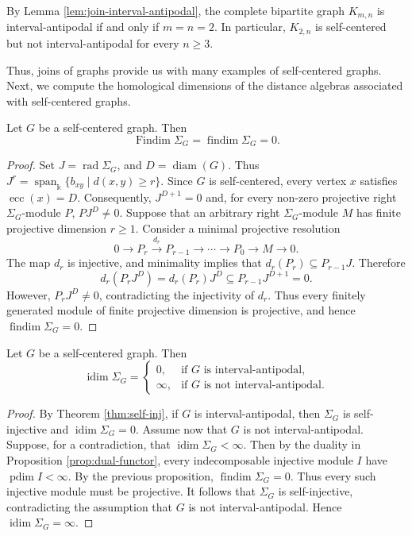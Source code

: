 \documentclass[a4paper,leqno]{amsart}
\begin{document}
\begin{eg}\label{eg:self-centered-revisited}
By Lemma \ref{lem:join-interval-antipodal}, the complete bipartite graph $K_{m,n}$ is interval-antipodal if and only if $m=n=2$. In particular, $K_{2,n}$ is self-centered but not interval-antipodal for every $n\geq3$.
\end{eg}

Thus, joins of graphs provide us with many examples of self-centered graphs. Next, we compute the homological dimensions of the distance algebras associated with self-centered graphs.

\begin{prop}
Let $G$ be a self-centered graph. Then
\[
\operatorname{Findim} \Sigma_G=\operatorname{findim} \Sigma_G=0.
\]
\end{prop}

\begin{proof}
Set $J=\operatorname{rad}\Sigma_G$, and $D=\operatorname{diam}(G)$.
Thus $J^r=\operatorname{span}_{\Bbbk}\{b_{xy}\mid d(x,y)\ge r\}$. Since $G$ is self-centered, every vertex $x$ satisfies $\operatorname{ecc}(x)=D$. Consequently, $J^{D+1}=0$ and, for every non-zero projective right $\Sigma_G$-module $P$, $PJ^D\neq 0$. Suppose that an arbitrary right $\Sigma_G$-module $M$ has finite projective dimension $r\geq 1$. Consider a minimal projective resolution
\[
0\longrightarrow P_r
 \xrightarrow{d_r}P_{r-1}
 \longrightarrow\cdots\longrightarrow P_0
 \longrightarrow M\longrightarrow 0.
\]
The map $d_r$ is injective, and minimality implies that $d_r(P_r)\subseteq P_{r-1}J$. Therefore
$$d_r(P_rJ^D)=d_r(P_r)J^D\subseteq P_{r-1}J^{D+1}=0.$$
However, $P_rJ^D\neq0$, contradicting the injectivity of $d_r$. Thus every finitely generated module of finite projective dimension is projective, and hence $\operatorname{findim}\Sigma_G=0$.
\end{proof}

\begin{prop}\label{prop:idim self-centered}
Let $G$ be a self-centered graph. Then
\[
\operatorname{idim} \Sigma_G=
\begin{cases}
0,      & \text{if $G$ is interval-antipodal},\\
\infty, & \text{if $G$ is not interval-antipodal}.
\end{cases}
\]
\end{prop}

\begin{proof}
By Theorem \ref{thm:self-inj}, if $G$ is interval-antipodal, then $\Sigma_G$ is self-injective and $\operatorname{idim}\Sigma_G=0$. 
Assume now that $G$ is not interval-antipodal. Suppose, for a  contradiction, that $\operatorname{idim}\Sigma_G<\infty$. Then by the duality in Proposition \ref{prop:dual-functor}, every indecomposable injective module $I$ have $\operatorname{pdim}I<\infty$. By the previous proposition, $\operatorname{findim}\Sigma_G=0$. Thus every such injective module must be projective. It follows that $\Sigma_G$ is
self-injective, contradicting the assumption that $G$ is not
interval-antipodal. Hence $\operatorname{idim}\Sigma_G=\infty$.
\end{proof}
\end{document}
